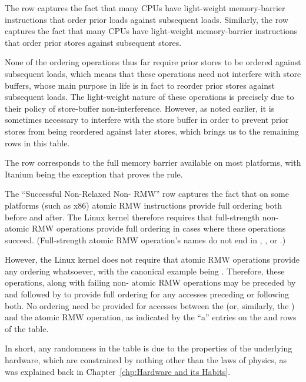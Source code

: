 {	The  row captures the fact that many CPUs have
	light-weight memory-barrier instructions that order prior loads against
	subsequent loads.
	Similarly,
	the  row captures the fact that many CPUs have
	light-weight memory-barrier instructions that order prior stores against
	subsequent stores.

	None of the ordering operations thus far require prior stores to be
	ordered against subsequent loads, which means that these operations
	need not interfere with store buffers, whose main purpose in life
	is in fact to reorder prior stores against subsequent loads.
	The light-weight nature of these operations is precisely due to
	their policy of store-buffer non-interference.
	However, as noted earlier, it is sometimes necessary to interfere
	with the store buffer in order to prevent prior stores from being
	reordered against later stores, which brings us to the remaining
	rows in this table.

	The  row corresponds to the full memory barrier
	available on most platforms, with Itanium being the exception
	that proves the rule.

	The ``Successful Non-Relaxed Non- RMW'' row captures
	the fact that on some platforms (such as x86) atomic RMW instructions
	provide full ordering both before and after.
	The Linux kernel therefore requires that full-strength non-
	atomic RMW operations provide full ordering in cases where these
	operations succeed.
	(Full-strength atomic RMW operation's names do not end in
	, , or .)

	However, the Linux kernel does not require that  atomic
	RMW operations provide any ordering whatsoever, with the
	canonical example being .
	Therefore, these operations, along with failing non-
	atomic RMW operations may be preceded by 
	and followed by  to provide full
	ordering for any accesses preceding or following both.
	No ordering need be provided for accesses between the
	 (or, similarly, the
	) and the atomic RMW operation, as
	indicated by the ``a'' entries on the 
	and  rows of the table.

	In short, any randomness in the table is due to the properties
	of the underlying hardware, which are constrained by nothing other
	than the laws of physics, as was explained back in
	Chapter~\ref{chp:Hardware and its Habits}.
} \QuickQuizEnd

